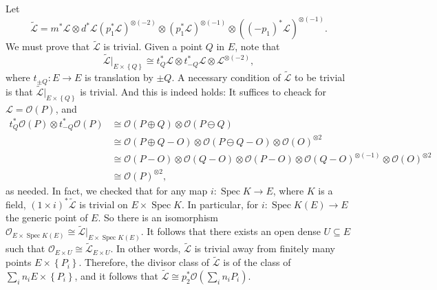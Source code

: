 Let \[ \widetilde{\mathcal{L}} = m^* \mathcal{L} \otimes d^* \mathcal{L} (p_1^* \mathcal{L})^{\otimes (-2)} \otimes (p_1^* \mathcal{L})^{\otimes (-1)} \otimes ((-p_1)^*\mathcal{L})^{\otimes (-1)} . \]
We must prove that \( \widetilde{\mathcal{L}} \) is trivial.
Given a point \( Q \) in \( E \), note that
\[ \widetilde{\mathcal{L}}|_{E \times \left\lbrace Q \right\rbrace} \cong t_Q^* \mathcal{L} \otimes t_{-Q}^* \mathcal{L} \otimes \mathcal{L}^{\otimes (-2)} , \]
where \( t_{\pm Q} \colon E \to E \) is translation by \( \pm Q \).
A necessary condition of \( \widetilde{\mathcal{L}} \) to be trivial is that \( \widetilde{\mathcal{L}} |_{E \times \left\lbrace Q \right\rbrace} \) is trivial.
And this is indeed holds: It suffices to cheack for \( \mathcal{L} = \mathcal{O}(P) \), and
\begin{align*}
  t_Q^* \mathcal{O}(P) \otimes t_{-Q}^* \mathcal{O}(P) & \cong \mathcal{O} (P \oplus Q) \otimes \mathcal{O}(P \ominus Q)  \\
                                                       & \cong \mathcal{O}(P \oplus Q - O) \otimes \mathcal{O}(P \ominus Q - O) \otimes \mathcal{O}(O)^{\otimes 2} \\
                                                       & \cong \mathcal{O}(P - O) \otimes \mathcal{O}(Q-O) \otimes \mathcal{O}(P-O) \otimes \mathcal{O}(Q-O)^{\otimes (-1)} \otimes \mathcal{O}(O)^{\otimes 2} \\
                                                       & \cong \mathcal{O}(P)^{\otimes 2} ,
\end{align*}
as needed.
In fact, we checked that for any map \( i \colon \operatorname{Spec} K \to E \), where \( K \) is a field, \( (1 \times i)^* \widetilde{\mathcal{L}} \) is trivial on \( E \times \operatorname{Spec} K \).
In particular, for \( i \colon \operatorname{Spec} K(E) \to E \) the generic point of \( E \).
So there is an isomorphism \( \mathcal{O}_{E \times \operatorname{Spec} K(E)} \cong \widetilde{\mathcal{L}}|_{E \times \operatorname{Spec} K(E)}  \).
It follows that there exists an open dense \( U \subseteq E \) such that \( \mathcal{O}_{E \times U} \cong \widetilde{\mathcal{L}}_{E \times U} \).
In other words, \( \widetilde{\mathcal{L}} \) is trivial away from finitely many points \( E \times \left\lbrace P_i \right\rbrace \).
Therefore, the divisor class of \( \widetilde{\mathcal{L}} \) is of the class of \( \sum_i n_i E \times \left\lbrace P_i \right\rbrace \), and it follows that
\( \widetilde{\mathcal{L}} \cong p_2^* \mathcal{O} \left( \sum_i n_i P_i \right) \).

